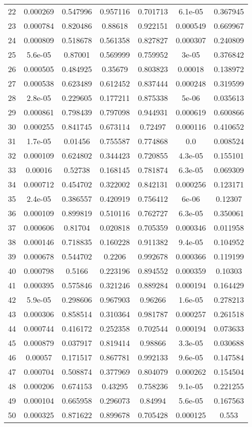 \begin{table}
\begin{tabular}{c|c|c|c|c|c|c}
22 & 0.000269 & 0.547996 & 0.957116 & 0.701713 & 6.1e-05 & 0.367945\\
23 & 0.000784 & 0.820486 & 0.88618 & 0.922151 & 0.000549 & 0.669967\\
24 & 0.000809 & 0.518678 & 0.561358 & 0.827827 & 0.000307 & 0.240809\\
25 & 5.6e-05 & 0.87001 & 0.569999 & 0.759952 & 3e-05 & 0.376842\\
26 & 0.000505 & 0.484925 & 0.35679 & 0.803823 & 0.00018 & 0.138972\\
27 & 0.000538 & 0.623489 & 0.612452 & 0.837444 & 0.000248 & 0.319599\\
28 & 2.8e-05 & 0.229605 & 0.177211 & 0.875338 & 5e-06 & 0.035613\\
29 & 0.000861 & 0.798439 & 0.797098 & 0.944931 & 0.000619 & 0.600866\\
30 & 0.000255 & 0.841745 & 0.673114 & 0.72497 & 0.000116 & 0.410652\\
31 & 1.7e-05 & 0.01456 & 0.755587 & 0.774868 & 0.0 & 0.008524\\
32 & 0.000109 & 0.624802 & 0.344423 & 0.720855 & 4.3e-05 & 0.155101\\
33 & 0.00016 & 0.52738 & 0.168145 & 0.781874 & 6.3e-05 & 0.069309\\
34 & 0.000712 & 0.454702 & 0.322002 & 0.842131 & 0.000256 & 0.123171\\
35 & 2.4e-05 & 0.386557 & 0.420919 & 0.756412 & 6e-06 & 0.12307\\
36 & 0.000109 & 0.899819 & 0.510116 & 0.762727 & 6.3e-05 & 0.350061\\
37 & 0.000606 & 0.81704 & 0.020818 & 0.705359 & 0.000346 & 0.011958\\
38 & 0.000146 & 0.718835 & 0.160228 & 0.911382 & 9.4e-05 & 0.104952\\
39 & 0.000678 & 0.544702 & 0.2206 & 0.992678 & 0.000366 & 0.119199\\
40 & 0.000798 & 0.5166 & 0.223196 & 0.894552 & 0.000359 & 0.10303\\
41 & 0.000395 & 0.575846 & 0.321246 & 0.889284 & 0.000194 & 0.164429\\
42 & 5.9e-05 & 0.298606 & 0.967903 & 0.96266 & 1.6e-05 & 0.278213\\
43 & 0.000306 & 0.858514 & 0.310364 & 0.981787 & 0.000257 & 0.261518\\
44 & 0.000744 & 0.416172 & 0.252358 & 0.702544 & 0.000194 & 0.073633\\
45 & 0.000879 & 0.037917 & 0.819414 & 0.98866 & 3.3e-05 & 0.030688\\
46 & 0.00057 & 0.171517 & 0.867781 & 0.992133 & 9.6e-05 & 0.147584\\
47 & 0.000704 & 0.508874 & 0.377969 & 0.804079 & 0.000262 & 0.154504\\
48 & 0.000206 & 0.674153 & 0.43295 & 0.758236 & 9.1e-05 & 0.221255\\
49 & 0.000104 & 0.665958 & 0.296073 & 0.84994 & 5.6e-05 & 0.167563\\
50 & 0.000325 & 0.871622 & 0.899678 & 0.705428 & 0.000125 & 0.553\\
\end{tabular}
\end{table}
